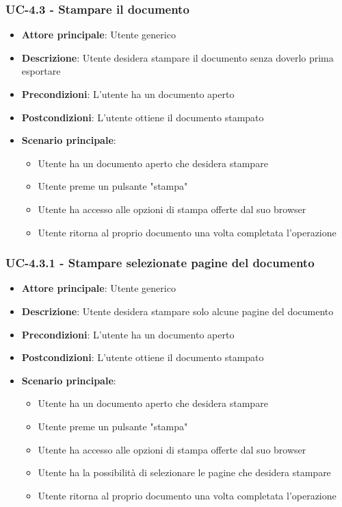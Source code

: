 \documentclass[11pt,a4paper]{article}
\begin{document}
\subsubsection{UC-4.3 - Stampare il documento}
\begin{itemize}
    \item \textbf{Attore principale}: Utente generico
    \item \textbf{Descrizione}: Utente desidera stampare il documento senza doverlo prima esportare
    \item \textbf{Precondizioni}: L'utente ha un documento aperto
    \item \textbf{Postcondizioni}: L'utente ottiene il documento stampato
    \item \textbf{Scenario principale}:
        \begin{itemize}
            \item Utente ha un documento aperto che desidera stampare
            \item Utente preme un pulsante "stampa"
            \item Utente ha accesso alle opzioni di stampa offerte dal suo browser
            \item Utente ritorna al proprio documento una volta completata l'operazione
        \end{itemize}
\end{itemize}

\subsubsection{UC-4.3.1 - Stampare selezionate pagine del documento}
\begin{itemize}
    \item \textbf{Attore principale}: Utente generico
    \item \textbf{Descrizione}: Utente desidera stampare solo alcune pagine del documento
    \item \textbf{Precondizioni}: L'utente ha un documento aperto
    \item \textbf{Postcondizioni}: L'utente ottiene il documento stampato
    \item \textbf{Scenario principale}:
        \begin{itemize}
            \item Utente ha un documento aperto che desidera stampare
            \item Utente preme un pulsante "stampa"
            \item Utente ha accesso alle opzioni di stampa offerte dal suo browser
            \item Utente ha la possibilità di selezionare le pagine che desidera stampare
            \item Utente ritorna al proprio documento una volta completata l'operazione
        \end{itemize}
\end{itemize}
\end{document}
